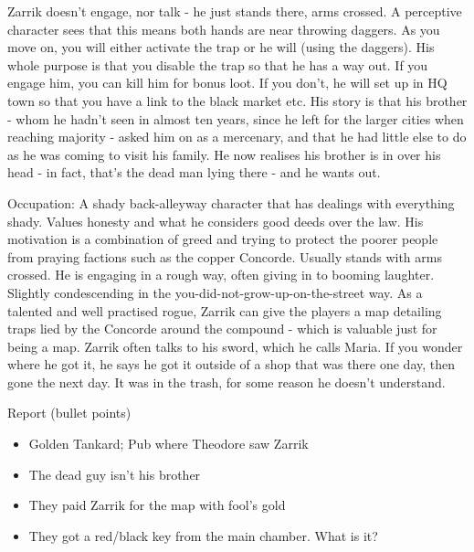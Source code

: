 Zarrik doesn't engage, nor talk - he just stands there, arms crossed. A perceptive character sees that this means both hands are near throwing daggers. As you move on, you will either activate the trap or he will (using the daggers). His whole purpose is that you disable the trap so that he has a way out. If you engage him, you can kill him for bonus loot. If you don't, he will set up in HQ town so that you have a link to the black market etc. His story is that his brother - whom he hadn't seen in almost ten years, since he left for the larger cities when reaching majority - asked him on  as a mercenary, and that he had little else to do as he was coming to visit his family. He now realises his brother is in over his head - in fact, that's the dead man lying there - and he wants out. 

Occupation: A shady back-alleyway character that has dealings with everything shady. Values honesty and what he considers good deeds over the law. His motivation is a combination of greed and trying to protect the poorer people from praying factions such as the copper Concorde. Usually stands with arms crossed. He is engaging in a rough way, often giving in to booming laughter. Slightly condescending in the you-did-not-grow-up-on-the-street way. As a talented and well practised rogue, Zarrik can give the players a map detailing traps lied by the Concorde around the compound - which is valuable just for being a map. Zarrik often talks to his sword, which he calls Maria. If you wonder where he got it, he says he got it outside of a shop that was there one day, then gone the next day. It was in the trash, for some reason he doesn't understand.

Report (bullet points)
\begin{itemize}
\item Golden Tankard; Pub where Theodore saw Zarrik
\item The dead guy isn't his brother
\item They paid Zarrik for the map with fool's gold
\item They got a red/black key from the main chamber. What is it?
\end{itemize}

